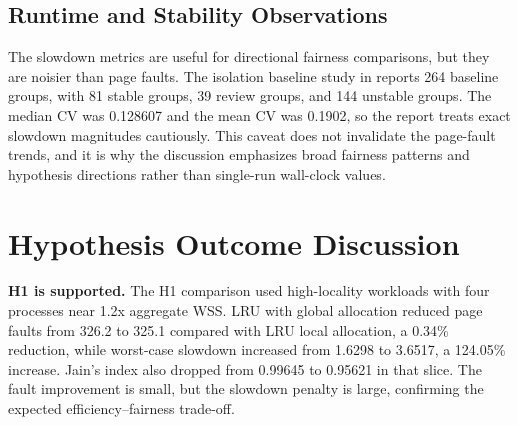 \documentclass[conference]{IEEEtran}
\newcommand{\file}[1]{\path{#1}}
\begin{document}
\begin{table}[t]
\centering
\scriptsize
\caption{Final H1/H2/H3 hypothesis summary.}
\label{tab:hypothesis_summary}
\end{table}

\subsection{Runtime and Stability Observations}
The slowdown metrics are useful for directional fairness comparisons, but they are noisier than page faults. The isolation baseline study in \file{docs/isolation\_stability.md} reports 264 baseline groups, with 81 stable groups, 39 review groups, and 144 unstable groups. The median CV was 0.128607 and the mean CV was 0.1902, so the report treats exact slowdown magnitudes cautiously. This caveat does not invalidate the page-fault trends, and it is why the discussion emphasizes broad fairness patterns and hypothesis directions rather than single-run wall-clock values.

\section{Hypothesis Outcome Discussion}
\textbf{H1 is supported.} The H1 comparison used high-locality workloads with four processes near 1.2x aggregate WSS. LRU with global allocation reduced page faults from 326.2 to 325.1 compared with LRU local allocation, a 0.34\% reduction, while worst-case slowdown increased from 1.6298 to 3.6517, a 124.05\% increase. Jain's index also dropped from 0.99645 to 0.95621 in that slice. The fault improvement is small, but the slowdown penalty is large, confirming the expected efficiency--fairness trade-off.
\end{document}
